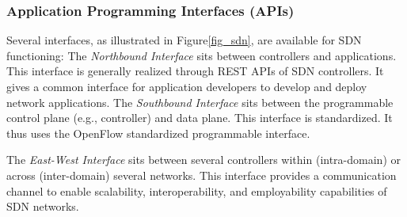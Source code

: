 \subsubsection{Application Programming Interfaces (APIs)}\label{sec:apis}
Several interfaces, as illustrated in Figure\ref{fig_sdn}, are available for SDN functioning:
The {\em Northbound Interface} sits between controllers and applications. This interface is generally realized through REST APIs of SDN controllers\citep{ref5}. It gives a common interface for application developers to develop and deploy network applications.
The {\em  Southbound Interface} sits between the programmable control plane (e.g., controller) and data plane. This interface is standardized. It thus uses the OpenFlow\citep{ref7} standardized programmable interface.

The {\em East-West Interface} sits between several controllers within (intra-domain) or across (inter-domain) several networks. This interface provides a communication channel to enable scalability, interoperability, and employability capabilities of SDN networks\citep{ref8}.